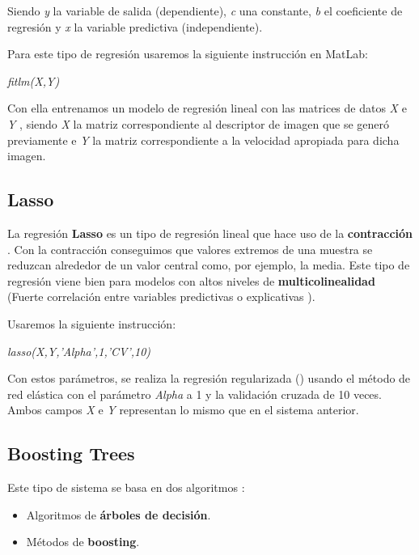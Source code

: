 Siendo \textit{y} la variable de salida (dependiente), \textit{c} una constante, \textit{b} el coeficiente de regresión y \textit{x} la variable predictiva (independiente).

Para este tipo de regresión usaremos la siguiente instrucción en MatLab:

\begin{center}
\textit{fitlm(X,Y)}
\end{center}

Con ella entrenamos un modelo de regresión lineal con las matrices de datos \textit{X} e \textit{Y} \cite{fitlm}, siendo \textit{X} la matriz correspondiente al descriptor de imagen que se generó previamente e \textit{Y} la matriz correspondiente a la velocidad apropiada para dicha imagen.

\subsection{Lasso}

La regresión \textbf{Lasso} \cite{lasso} es un tipo de regresión lineal que hace uso de la \textbf{contracción} \cite{shrinkage}. Con la contracción conseguimos que valores extremos de una muestra se reduzcan alrededor de un valor central como, por ejemplo, la media. Este tipo de regresión viene bien para modelos con altos niveles de \textbf{multicolinealidad} (Fuerte correlación entre variables predictivas o explicativas \cite{multicollinearity}).

Usaremos la siguiente instrucción:

\begin{center}
\textit{lasso(X,Y,'Alpha',1,'CV',10)}
\end{center}

Con estos parámetros, se realiza la regresión regularizada (\cite{lasso-matlab}) usando el método de red elástica \cite{elasticnet} con el parámetro \textit{Alpha} a 1 y la validación cruzada \cite{cv} de 10 veces. Ambos campos \textit{X} e \textit{Y} representan lo mismo que en el sistema anterior.

\subsection{Boosting Trees}

Este tipo de sistema se basa en dos algoritmos \cite{boosting-trees}:

\begin{itemize}
\item Algoritmos de \textbf{árboles de decisión}.
\item Métodos de \textbf{boosting}.
\end{itemize}

